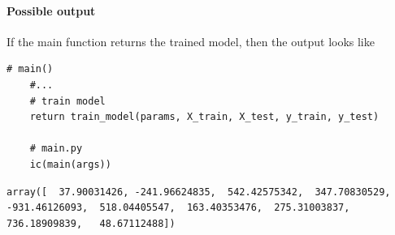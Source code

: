 \paragraph{Possible output}
If the main function returns the trained model, then the output looks like
\begin{lstlisting}[language=iPython]
	# main()
	#...
	# train model
	return train_model(params, X_train, X_test, y_train, y_test)
	
	# main.py
	ic(main(args))
\end{lstlisting}
\begin{lstlisting}[style=CMD, caption={Output of the ic() function, captionpos=b}]
array([  37.90031426, -241.96624835,  542.42575342,  347.70830529,
-931.46126093,  518.04405547,  163.40353476,  275.31003837,
736.18909839,   48.67112488])
\end{lstlisting}



